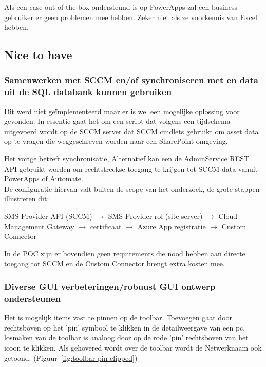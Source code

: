 Als een case out of the box ondersteund is op PowerApps zal een business gebruiker er geen problemen mee hebben. Zeker niet als ze voorkennis van Excel hebben.

\subsection{Nice to have}

\subsubsection{Samenwerken met SCCM en/of synchroniseren met en data uit de SQL databank kunnen gebruiken}

Dit werd niet geïmplementeerd maar er is wel een mogelijke oplossing voor gevonden.
In essentie gaat het om een script dat volgens een tijdschema uitgevoerd wordt op de SCCM server dat SCCM cmdlets gebruikt om asset data op te vragen die weggeschreven worden naar een SharePoint omgeving.\autocite{Ziehnert2020}

Het vorige betreft synchronisatie, Alternatief kan een de AdminService REST API gebruikt worden om rechtstreekse toegang te krijgen tot SCCM data vanuit PowerApps of Automate. \autocite{Gross2019}\\
De configuratie hiervan valt buiten de scope van het onderzoek, de grote stappen illustreren dit:

SMS Provider API (SCCM) $\rightarrow$ SMS Provider rol (site server) $\rightarrow$ Cloud Management Gateway $\rightarrow$ certificaat $\rightarrow$ Azure App registratie $\rightarrow$ Custom Connector

In de POC zijn er bovendien geen requirements die nood hebben aan directe toegang tot SCCM en de Custom Connector brengt extra kosten mee.

\subsubsection{Diverse GUI verbeteringen/robuust GUI ontwerp ondersteunen}


Het is mogelijk items vast te pinnen op de toolbar. Toevoegen gaat door rechtsboven op het 'pin' symbool te klikken in de detailweergave van een pc. losmaken van de toolbar is analoog door op de rode 'pin' rechtsboven van het icoon te klikken. Als gehovered wordt over de toolbar wordt de Netwerknaam ook getoond. (Figuur~\ref{fig:toolbar-pin-clipped})


